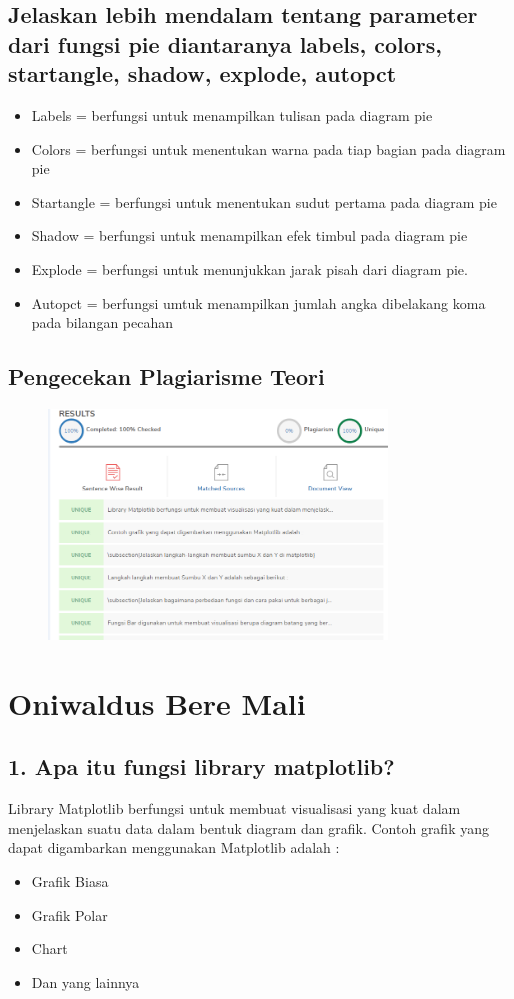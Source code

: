 \subsection{Jelaskan lebih mendalam tentang parameter dari fungsi pie diantaranya labels, colors, startangle, shadow, explode, autopct}
\begin{itemize}
    \item Labels = berfungsi untuk menampilkan tulisan pada diagram pie
    \item Colors = berfungsi untuk menentukan warna pada tiap bagian pada diagram pie
    \item Startangle = berfungsi untuk menentukan sudut pertama pada diagram pie
    \item Shadow = berfungsi untuk menampilkan efek timbul pada diagram pie
    \item Explode = berfungsi untuk menunjukkan jarak pisah dari diagram pie.
    \item Autopct = berfungsi umtuk menampilkan jumlah angka dibelakang koma pada bilangan pecahan
\end{itemize}

\subsection{Pengecekan Plagiarisme Teori}
\begin{figure}[H]
    \includegraphics[width=9cm]{figures/6/Teori/1174051/plagiat.png}
    \centering
\end{figure}



\section{Oniwaldus Bere Mali}
\subsection{1. Apa itu fungsi library matplotlib?}
Library Matplotlib berfungsi untuk membuat visualisasi yang kuat dalam menjelaskan suatu data dalam bentuk diagram dan grafik. 
Contoh grafik yang dapat digambarkan menggunakan Matplotlib adalah :
\begin{itemize}
\item Grafik Biasa 
\item Grafik Polar
\item Chart
\item Dan yang lainnya
\end{itemize}

